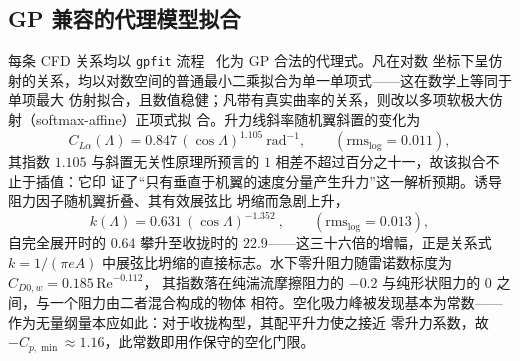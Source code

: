 \documentclass[a4paper,10pt,twocolumn]{ctexart}
\begin{document}
\subsection{GP 兼容的代理模型拟合}
每条 CFD 关系均以 \texttt{gpfit} 流程~\cite{hoburg2016data} 化为 GP 合法的代理式。凡在对数
坐标下呈仿射的关系，均以对数空间的普通最小二乘拟合为单一单项式——这在数学上等同于单项最大
仿射拟合，且数值稳健；凡带有真实曲率的关系，则改以多项软极大仿射（softmax-affine）正项式拟
合。升力线斜率随机翼斜置的变化为
\begin{equation}
C_{L\alpha}(\Lambda) = 0.847\,(\cos\Lambda)^{1.105}\ \text{rad}^{-1},
\qquad(\text{rms}_{\log}=0.011),
\label{eq:clalpha}
\end{equation}
其指数 $1.105$ 与斜置无关性原理所预言的 $1$ 相差不超过百分之十一，故该拟合不止于插值：它印
证了“只有垂直于机翼的速度分量产生升力”这一解析预期。诱导阻力因子随机翼折叠、其有效展弦比
坍缩而急剧上升，
\begin{equation}
k(\Lambda) = 0.631\,(\cos\Lambda)^{-1.352}\ ,
\qquad(\text{rms}_{\log}=0.013),
\label{eq:kschedule}
\end{equation}
自完全展开时的 $0.64$ 攀升至收拢时的 $22.9$——这三十六倍的增幅，正是关系式 $k=1/(\pi e A)$
中展弦比坍缩的直接标志。水下零升阻力随雷诺数标度为 $C_{D0,w}=0.185\,\mathrm{Re}^{-0.112}$，
其指数落在纯湍流摩擦阻力的 $-0.2$ 与纯形状阻力的 $0$ 之间，与一个阻力由二者混合构成的物体
相符。空化吸力峰被发现基本为常数——作为无量纲量本应如此：对于收拢构型，其配平升力使之接近
零升力系数，故 $-C_{p,\min}\approx1.16$，此常数即用作保守的空化门限。
\end{document}

